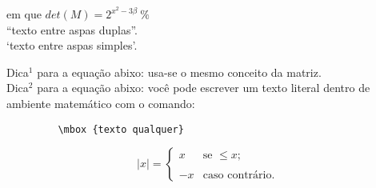 \documentclass[12pt, twocolumn]{article}
\begin{document}
    em que $det(M) = 2^{x^2-3\beta} \ \%$\\
    
    ``texto entre aspas duplas''.\\

     `texto entre aspas simples'.
     
    Dica$^1$ para a equação abixo: usa-se o mesmo conceito da matriz.\\
    
     Dica$^2$ para a equação abixo: você pode escrever um texto literal dentro de ambiente matemático com o comando:
     \begin{verbatim}
         \mbox {texto qualquer}
     \end{verbatim}
    
    
	$$
	|x| =  \left\{
	\begin{array}{lll}
    	x     &   \mbox{se } \leq x ;\\ \\
    	-x    & 	 \mbox{caso contrário}.
	\end{array}
	\right.
	$$

     
    








    
\end{document}
